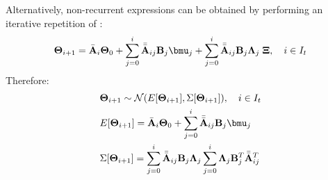 Alternatively, non-recurrent expressions can be obtained by performing an iterative repetition of :
\begin{equation*}
  \vtemperature_{i + 1} = \aone_i \vtemperature_0 + \sum_{j = 0}^{i} \atwo_{ij} \m{B}_j \vmean{j} + \sum_{j = 0}^{i} \atwo_{ij} \m{B}_j \ddeviation{j} \; \vstdnormal, \sep i \in \timeindex
\end{equation*}
Therefore:
\begin{align*}
  & \vtemperature_{i + 1} \sim \normal(\expectation{\vtemperature_{i + 1}}, \covariance{\vtemperature_{i + 1}}), \sep i \in \timeindex \\
  & \expectation{\vtemperature_{i + 1}} = \aone_i \vtemperature_0 + \sum_{j = 0}^{i} \atwo_{ij} \m{B}_j \vmean{j} \\
  & \covariance{\vtemperature_{i + 1}} = \sum_{j = 0}^{i} \atwo_{ij} \m{B}_j \ddeviation{j} \sum_{j = 0}^{i} \ddeviation{j} \m{B}_j^T \atwo_{ij}^T
\end{align*}
